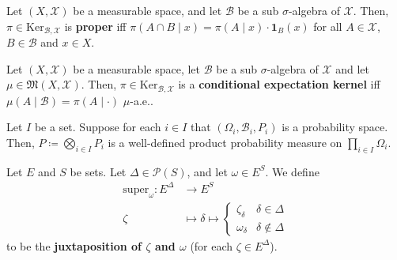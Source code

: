 \begin{definition}
    \label{def:proper-kernel}
    \leanok

    Let $(X,\mathcal{X})$ be a measurable space, and let $\mathcal{B}$ be a sub $\sigma$-algebra of $\mathcal{X}$. Then, $\pi\in\text{Ker}_{\mathcal{B},\mathcal{X}}$ is \textbf{proper} iff $\pi(A\cap B\mid x)=\pi(A\mid x)\cdot\mathbf{1}_B(x)$ for all $A\in\mathcal{X}$, $B\in\mathcal{B}$ and $x\in X$.
\end{definition}

\begin{definition}
    \label{def:cond-exp-kernel}
    \leanok

    Let $(X,\mathcal{X})$ be a measurable space, let $\mathcal{B}$ be a sub $\sigma$-algebra of $\mathcal{X}$ and let $\mu\in\mathfrak{M}(X,\mathcal{X})$. Then, $\pi\in\text{Ker}_{\mathcal{B},\mathcal{X}}$ is a \textbf{conditional expectation kernel} iff $\mu(A\mid \mathcal{B})=\pi(A\mid\cdot)$ $\mu$-a.e..
\end{definition}

\begin{definition}
    \label{def:product-probability-measure}
    \leanok

    Let $I$ be a set. Suppose for each $i\in I$ that $(\Omega_i,\mathcal{B}_i,P_i)$ is a probability space. Then, $P\coloneqq\bigotimes_{i\in I}P_i$ is a well-defined product probability measure on $\prod_{i\in I}\Omega_i$.
\end{definition}

\begin{definition}[Juxtaposition]
    \label{def:juxtaposition}
    \leanok

    Let $E$ and $S$ be sets. Let $\Delta\in\mathcal{P}(S)$, and let $\omega\in E^S$. We define
    \begin{align*}
        \text{super}_\omega:E^\Delta&\to E^S\\
        \zeta&\mapsto \delta\mapsto\begin{cases}
            \zeta_\delta & \delta\in\Delta\\
            \omega_\delta & \delta\notin\Delta
        \end{cases}
    \end{align*}
    to be the \textbf{juxtaposition of $\zeta$ and $\omega$} (for each $\zeta\in E^\Delta$).
\end{definition}
